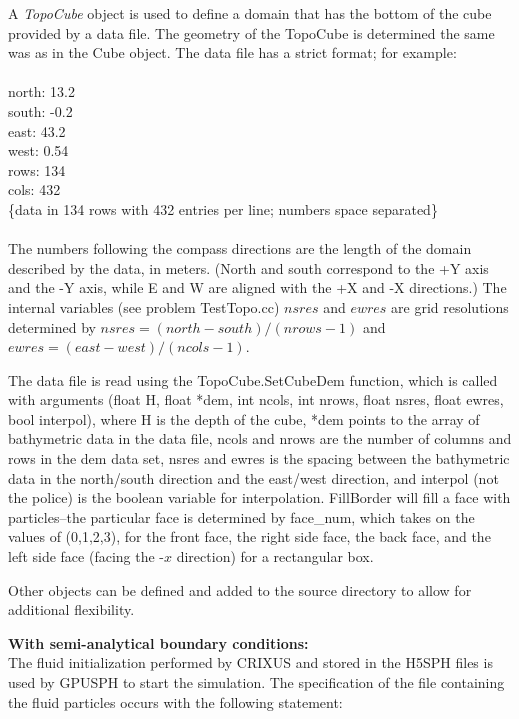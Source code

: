 \documentclass{../GPUSPHtemplate}
\begin{document}
A {\em TopoCube} object is used to define a domain that has the bottom
of the cube provided by a data file. The geometry of the TopoCube is
determined the same was as in the Cube object. The data file has a
strict format; for example: \\\\ north: 13.2 \\ south: -0.2\\ east:
43.2 \\ west: 0.54 \\ rows: 134\\ cols: 432 \\ \{data in 134 rows
with 432 entries per line; numbers space separated\}\\ \\ The numbers
following the compass directions are the length of the domain described
by the data, in meters. (North and south correspond to the +Y axis and
the -Y axis, while E and W are aligned with the +X and -X directions.)
The internal variables (see problem TestTopo.cc) $nsres$ and $ewres$ are
grid resolutions determined by $nsres= (north-south)/(nrows-1)$ and
$ewres= (east -west)/(ncols-1)$.

The data file is read using the TopoCube.SetCubeDem function, which is
called with arguments (float H, float *dem, int ncols, int nrows, float
nsres, float ewres, bool interpol), where H is the depth of the cube,
*dem points to the array of bathymetric data in the data file, ncols and
nrows are the number of columns and rows in the dem data set, nsres and
ewres is the spacing between the bathymetric data in the north/south
direction and the east/west direction, and interpol (not the police) is
the boolean variable for interpolation. FillBorder will fill a face
with particles--the particular face is determined by face\_num, which
takes on the values of (0,1,2,3), for the front face, the right side
face, the back face, and the left side face (facing the -$x$ direction)
for a rectangular box.

Other objects can be defined and added to the source directory to allow
for additional flexibility.

\textbf{With semi-analytical boundary conditions:}\\

The fluid initialization performed by CRIXUS and stored in the H5SPH 
files is used by GPUSPH to start the simulation. 
The specification of the file containing the fluid particles occurs with the following statement:
\end{document}
